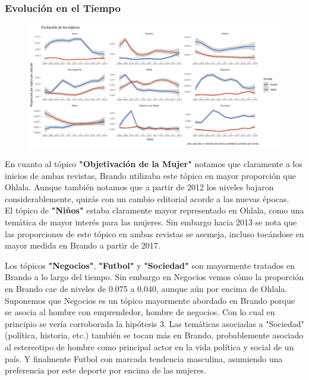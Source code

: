 \documentclass[a4paper]{article}
\begin{document}
\subsubsection{Evoluci\'on en el Tiempo}

\begin{figure}[H]
\centering
\includegraphics[width=1\textwidth]{graficos/evol_topicos_smooth.png}
\end{figure}

En cuanto al t\'opico \textbf{"Objetivaci\'on de la Mujer"} notamos que claramente a los inicios de ambas revistas, Brando utilizaba este t\'opico en mayor proporci\'on que Ohlala. Aunque tambi\'en notamos que a partir de 2012 los niveles bajaron considerablemente, quiz\'as con un cambio editorial acorde a las nuevas \'epocas.\\

El t\'opico de \textbf{"Ni\~nos"} estaba claramente mayor representado en Ohlala, como una tem\'atica de mayor inter\'es para las mujeres. Sin embargo hacia 2013 se nota que las proporciones de este t\'opico en ambas revistas se asemeja, incluso toc\'andose en mayor medida en Brando a partir de 2017.

Los t\'opicos \textbf{"Negocios"}, \textbf{"Futbol"} y \textbf{"Sociedad"} son mayormente tratados en Brando a lo largo del tiempo. Sin embargo en Negocios vemos c\'omo la proporci\'on en Brando cae de niveles de 0.075 a 0.040, aunque a\'un por encima de Ohlala.
Suponemos que Negocios es un t\'opico mayormente abordado en Brando porque se asocia al hombre con emprendedor, hombre de negocios. Con lo cual en principio se ver\'ia corroborada la hip\'otesis 3.
Las tem\'aticas asociadas a "Sociedad" (pol\'itica, historia, etc.) tambi\'en se tocan m\'as en Brando, probablemente asociado al estereotipo de hombre como principal actor en la vida pol\'itica y social de un pa\'is.
Y finalmente Futbol con marcada tendencia masculina, asumiendo una preferencia por este deporte por encima de las mujeres.\\
\end{document}
